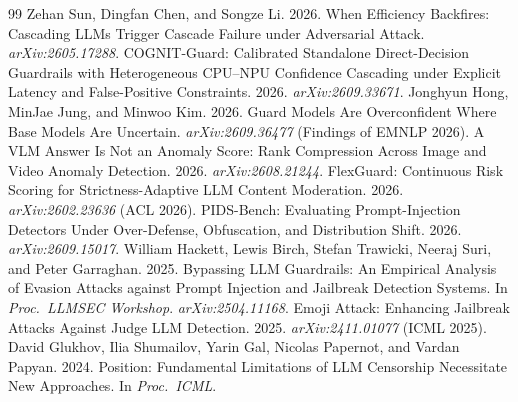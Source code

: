 \documentclass[11pt]{article}
\begin{document}
\begin{thebibliography}{99}
 Zehan Sun, Dingfan Chen, and Songze Li. 2026. When Efficiency Backfires: Cascading LLMs Trigger Cascade Failure under Adversarial Attack. \emph{arXiv:2605.17288}.
 COGNIT-Guard: Calibrated Standalone Direct-Decision Guardrails with Heterogeneous CPU--NPU Confidence Cascading under Explicit Latency and False-Positive Constraints. 2026. \emph{arXiv:2609.33671}.
 Jonghyun Hong, MinJae Jung, and Minwoo Kim. 2026. Guard Models Are Overconfident Where Base Models Are Uncertain. \emph{arXiv:2609.36477} (Findings of EMNLP 2026).
 A VLM Answer Is Not an Anomaly Score: Rank Compression Across Image and Video Anomaly Detection. 2026. \emph{arXiv:2608.21244}.
 FlexGuard: Continuous Risk Scoring for Strictness-Adaptive LLM Content Moderation. 2026. \emph{arXiv:2602.23636} (ACL 2026).
 PIDS-Bench: Evaluating Prompt-Injection Detectors Under Over-Defense, Obfuscation, and Distribution Shift. 2026. \emph{arXiv:2609.15017}.
 William Hackett, Lewis Birch, Stefan Trawicki, Neeraj Suri, and Peter Garraghan. 2025. Bypassing LLM Guardrails: An Empirical Analysis of Evasion Attacks against Prompt Injection and Jailbreak Detection Systems. In \emph{Proc.\ LLMSEC Workshop}. \emph{arXiv:2504.11168}.
 Emoji Attack: Enhancing Jailbreak Attacks Against Judge LLM Detection. 2025. \emph{arXiv:2411.01077} (ICML 2025).
 David Glukhov, Ilia Shumailov, Yarin Gal, Nicolas Papernot, and Vardan Papyan. 2024. Position: Fundamental Limitations of LLM Censorship Necessitate New Approaches. In \emph{Proc.\ ICML}.
\end{thebibliography}
\end{document}
